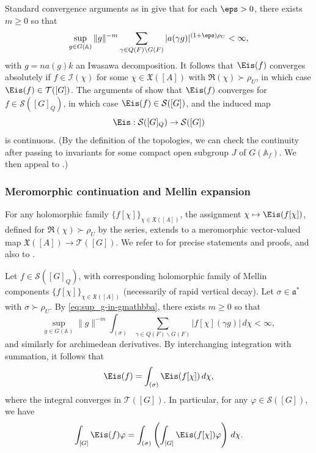 Standard convergence arguments as in \cite[Theoerm 12.4 and \S12.5]{MR2331343} give that for each $\eps > 0$, there exists $m \geq 0$ so that
\begin{equation}\label{eq:sup_g-in-gmathbba}
  \sup_{g \in G(\mathbb{A})} \|g\|^{-m}
  \sum_{\gamma \in Q(F) \backslash G(F)} |a(\gamma g)|^{(1+\eps) \rho_U}  < \infty,
\end{equation}
with $g = n a(g) k$ an Iwasawa decomposition.  It follows that $\Eis(f)$ converges absolutely if $f \in \mathcal{I}(\chi)$ for some $\chi \in \mathfrak{X}([A])$ with $\Re(\chi) \succ \rho_U$, in which case $\Eis(f) \in \mathcal{T}([G])$.   The arguments of \cite[\S II.1.7, II.1.10]{MR1361168} show that $\Eis(f)$ converges for $f \in \mathcal{S}([G]_Q)$, in which case $\Eis(f) \in \mathcal{S}([G])$, and the induced map
\begin{equation*}
  \Eis : \mathcal{S}([G]_Q) \rightarrow \mathcal{S}([G])
\end{equation*}
is continuous.  (By the definition of the topologies, we can check the continuity after passing to invariants for some compact open subgroup $J$ of $G(\mathbb{A}_f)$.  We then appeal to \cite[Prop 1.13]{MR1001613}.)

\subsubsection{Meromorphic continuation and Mellin expansion}
For any holomorphic family $\{f[\chi]\}_{\chi \in \mathfrak{X}([A])}$, the assignment $\chi \mapsto \Eis(f[\chi])$, defined for $\Re(\chi) \succ \rho_U$ by the series, extends to a meromorphic vector-valued map $\mathfrak{X}([A]) \rightarrow \mathcal{T}([G])$.  We refer to \cite{MR2402686} for precise statements and proofs, and also to \cite[Thm 11.7]{MR3219530}.

Let $f \in \mathcal{S}([G]_Q)$, with corresponding holomorphic family of Mellin components $\{f[\chi]\}_{\chi \in \mathfrak{X}([A])}$ (necessarily of rapid vertical decay).  Let $\sigma \in \mathfrak{a}^*$ with $\sigma \succ \rho_U$.  By \eqref{eq:sup_g-in-gmathbba}, there exists $m \geq 0$ so that
\begin{equation*}
  \sup_{g \in G(\mathbb{A})} \|g\|^{-m}
  \int_{ (\sigma)  }
  \sum_{\gamma \in Q(F) \backslash G(F)} |f[\chi](\gamma g)| \, d \chi  < \infty,
\end{equation*}
and similarly for archimedean derivatives.  By interchanging integration with summation, it follows that
\begin{equation}\label{eq:eisf-=-int}
  \Eis(f) = \int_{(\sigma) } \Eis(f[\chi]) \, d \chi,
\end{equation}
where the integral converges in $\mathcal{T}([G])$.  In particular, for any $\varphi \in \mathcal{S}([G])$, we have
\begin{equation}\label{eq:int-_g-eisf}
  \int_{[G]} \Eis(f) \varphi
  = \int_{(\sigma)}
  \left( \int_{[G]} \Eis(f[\chi]) \varphi  \right) \, d \chi.
\end{equation}


